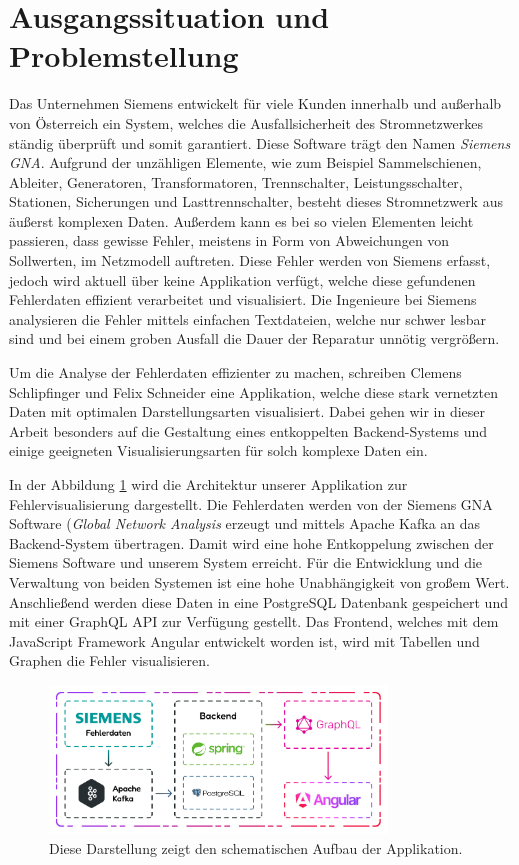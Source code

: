 \section{Ausgangssituation und Problemstellung}

Das Unternehmen Siemens entwickelt für viele Kunden innerhalb und außerhalb von Österreich ein System, welches die Ausfallsicherheit des Stromnetzwerkes ständig überprüft und somit garantiert. Diese Software trägt den Namen \emph{Siemens GNA}. Aufgrund der unzähligen Elemente, wie zum Beispiel Sammelschienen, Ableiter, Generatoren, Transformatoren, Trennschalter, Leistungsschalter, Stationen, Sicherungen und Lasttrennschalter, besteht dieses Stromnetzwerk aus äußerst komplexen Daten. Außerdem kann es bei so vielen Elementen leicht passieren, dass gewisse Fehler, meistens in Form von Abweichungen von Sollwerten, im Netzmodell auftreten. Diese Fehler werden von Siemens erfasst, jedoch wird aktuell über keine Applikation verfügt, welche diese gefundenen Fehlerdaten effizient verarbeitet und visualisiert. Die Ingenieure bei Siemens analysieren die Fehler mittels einfachen Textdateien, welche nur schwer lesbar sind und bei einem groben Ausfall die Dauer der Reparatur unnötig vergrößern.

Um die Analyse der Fehlerdaten effizienter zu machen, schreiben Clemens Schlipfinger und Felix Schneider eine Applikation, welche diese stark vernetzten Daten mit optimalen Darstellungsarten visualisiert. Dabei gehen wir in dieser Arbeit besonders auf die Gestaltung eines entkoppelten Backend-Systems und einige geeigneten Visualisierungsarten für solch komplexe Daten ein. 

In der Abbildung \ref{fig:architecture_einleitung} wird die Architektur unserer Applikation zur Fehlervisualisierung dargestellt. Die Fehlerdaten werden von der Siemens GNA Software (\emph{Global Network Analysis} erzeugt und mittels Apache Kafka an das Backend-System übertragen. Damit wird eine hohe Entkoppelung zwischen der Siemens Software und unserem System erreicht. Für die Entwicklung und die Verwaltung von beiden Systemen ist eine hohe Unabhängigkeit von großem Wert. Anschließend werden diese Daten in eine PostgreSQL Datenbank gespeichert und mit einer GraphQL API zur Verfügung gestellt. Das Frontend, welches mit dem JavaScript Framework Angular entwickelt worden ist, wird mit Tabellen und Graphen die Fehler visualisieren.  

\begin{figure}
    \centering
    \includegraphics[width=0.8\textwidth]{content/img/Architecture/Architecture.jpg}
    \caption{Diese Darstellung zeigt den schematischen Aufbau der Applikation.}
    \label{fig:architecture_einleitung}
\end{figure}
\FloatBarrier